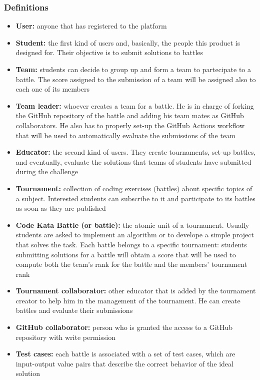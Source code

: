\subsubsection{Definitions}
\begin{itemize}
    \item {\textbf{User:} anyone that has registered to the platform}
    \item {\textbf{Student:} the first kind of users and, basically, the people this product is designed for. Their objective is to submit solutions to battles}
    \item {\textbf{Team:} students can decide to group up and form a team to partecipate to a battle. The score assigned to the submission of a team will be assigned also to each one of its members}
    \item {\textbf{Team leader:} whoever creates a team for a battle. He is in charge of forking the GitHub repository of the battle and adding his team mates as GitHub collaborators. He also has to properly set-up the GitHub Actions workflow that will be used to automatically evaluate the submissions of the team}
    \item {\textbf{Educator:} the second kind of users. They create tournaments, set-up battles, and eventually, evaluate the solutions that teams of students have submitted during the challenge}
    \item {\textbf{Tournament:} collection of coding exercises (battles) about specific topics of a subject. Interested students can subscribe to it and participate to its battles as soon as they are published}
    \item {\textbf{Code Kata Battle (or battle):} the atomic unit of a tournament. Usually students are asked to implement an algorithm or to develope a simple project that solves the task. Each battle belongs to a specific tournament: students submitting solutions for a battle will obtain a score that will be used to compute both the team's rank for the battle and the members' tournament rank}
    \item {\textbf{Tournament collaborator:} other educator that is added by the tournament creator to help him in the management of the tournament. He can create battles and evaluate their submissions}
    \item {\textbf{GitHub collaborator:} person who is granted the access to a GitHub repository with write permission}
    \item {\textbf{Test cases:} each battle is associated with a set of test cases, which  are input-output value pairs that describe the correct behavior of the ideal solution}

\end{itemize}
